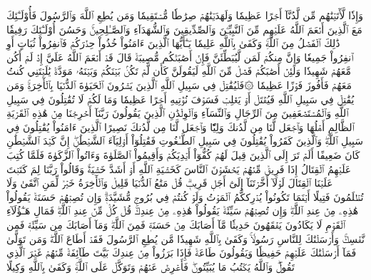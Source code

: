 وَإِذٗا لَّأٓتَيۡنَٰهُم مِّن لَّدُنَّآ أَجۡرًا عَظِيمٗا
وَلَهَدَيۡنَٰهُمۡ صِرَٰطٗا مُّسۡتَقِيمٗا
وَمَن يُطِعِ ٱللَّهَ وَٱلرَّسُولَ فَأُوْلَـٰٓئِكَ مَعَ ٱلَّذِينَ أَنۡعَمَ ٱللَّهُ عَلَيۡهِم مِّنَ ٱلنَّبِيِّـۧنَ وَٱلصِّدِّيقِينَ وَٱلشُّهَدَآءِ وَٱلصَّـٰلِحِينَۚ وَحَسُنَ أُوْلَـٰٓئِكَ رَفِيقٗا
ذَٰلِكَ ٱلۡفَضۡلُ مِنَ ٱللَّهِۚ وَكَفَىٰ بِٱللَّهِ عَلِيمٗا
يَـٰٓأَيُّهَا ٱلَّذِينَ ءَامَنُواْ خُذُواْ حِذۡرَكُمۡ فَٱنفِرُواْ ثُبَاتٍ أَوِ ٱنفِرُواْ جَمِيعٗا
وَإِنَّ مِنكُمۡ لَمَن لَّيُبَطِّئَنَّ فَإِنۡ أَصَٰبَتۡكُم مُّصِيبَةٞ قَالَ قَدۡ أَنۡعَمَ ٱللَّهُ عَلَيَّ إِذۡ لَمۡ أَكُن مَّعَهُمۡ شَهِيدٗا
وَلَئِنۡ أَصَٰبَكُمۡ فَضۡلٞ مِّنَ ٱللَّهِ لَيَقُولَنَّ كَأَن لَّمۡ تَكُنۢ بَيۡنَكُمۡ وَبَيۡنَهُۥ مَوَدَّةٞ يَٰلَيۡتَنِي كُنتُ مَعَهُمۡ فَأَفُوزَ فَوۡزًا عَظِيمٗا
۞فَلۡيُقَٰتِلۡ فِي سَبِيلِ ٱللَّهِ ٱلَّذِينَ يَشۡرُونَ ٱلۡحَيَوٰةَ ٱلدُّنۡيَا بِٱلۡأٓخِرَةِۚ وَمَن يُقَٰتِلۡ فِي سَبِيلِ ٱللَّهِ فَيُقۡتَلۡ أَوۡ يَغۡلِبۡ فَسَوۡفَ نُؤۡتِيهِ أَجۡرًا عَظِيمٗا
وَمَا لَكُمۡ لَا تُقَٰتِلُونَ فِي سَبِيلِ ٱللَّهِ وَٱلۡمُسۡتَضۡعَفِينَ مِنَ ٱلرِّجَالِ وَٱلنِّسَآءِ وَٱلۡوِلۡدَٰنِ ٱلَّذِينَ يَقُولُونَ رَبَّنَآ أَخۡرِجۡنَا مِنۡ هَٰذِهِ ٱلۡقَرۡيَةِ ٱلظَّالِمِ أَهۡلُهَا وَٱجۡعَل لَّنَا مِن لَّدُنكَ وَلِيّٗا وَٱجۡعَل لَّنَا مِن لَّدُنكَ نَصِيرًا
ٱلَّذِينَ ءَامَنُواْ يُقَٰتِلُونَ فِي سَبِيلِ ٱللَّهِۖ وَٱلَّذِينَ كَفَرُواْ يُقَٰتِلُونَ فِي سَبِيلِ ٱلطَّـٰغُوتِ فَقَٰتِلُوٓاْ أَوۡلِيَآءَ ٱلشَّيۡطَٰنِۖ إِنَّ كَيۡدَ ٱلشَّيۡطَٰنِ كَانَ ضَعِيفًا
أَلَمۡ تَرَ إِلَى ٱلَّذِينَ قِيلَ لَهُمۡ كُفُّوٓاْ أَيۡدِيَكُمۡ وَأَقِيمُواْ ٱلصَّلَوٰةَ وَءَاتُواْ ٱلزَّكَوٰةَ فَلَمَّا كُتِبَ عَلَيۡهِمُ ٱلۡقِتَالُ إِذَا فَرِيقٞ مِّنۡهُمۡ يَخۡشَوۡنَ ٱلنَّاسَ كَخَشۡيَةِ ٱللَّهِ أَوۡ أَشَدَّ خَشۡيَةٗۚ وَقَالُواْ رَبَّنَا لِمَ كَتَبۡتَ عَلَيۡنَا ٱلۡقِتَالَ لَوۡلَآ أَخَّرۡتَنَآ إِلَىٰٓ أَجَلٖ قَرِيبٖۗ قُلۡ مَتَٰعُ ٱلدُّنۡيَا قَلِيلٞ وَٱلۡأٓخِرَةُ خَيۡرٞ لِّمَنِ ٱتَّقَىٰ وَلَا تُظۡلَمُونَ فَتِيلًا
أَيۡنَمَا تَكُونُواْ يُدۡرِككُّمُ ٱلۡمَوۡتُ وَلَوۡ كُنتُمۡ فِي بُرُوجٖ مُّشَيَّدَةٖۗ وَإِن تُصِبۡهُمۡ حَسَنَةٞ يَقُولُواْ هَٰذِهِۦ مِنۡ عِندِ ٱللَّهِۖ وَإِن تُصِبۡهُمۡ سَيِّئَةٞ يَقُولُواْ هَٰذِهِۦ مِنۡ عِندِكَۚ قُلۡ كُلّٞ مِّنۡ عِندِ ٱللَّهِۖ فَمَالِ هَـٰٓؤُلَآءِ ٱلۡقَوۡمِ لَا يَكَادُونَ يَفۡقَهُونَ حَدِيثٗا
مَّآ أَصَابَكَ مِنۡ حَسَنَةٖ فَمِنَ ٱللَّهِۖ وَمَآ أَصَابَكَ مِن سَيِّئَةٖ فَمِن نَّفۡسِكَۚ وَأَرۡسَلۡنَٰكَ لِلنَّاسِ رَسُولٗاۚ وَكَفَىٰ بِٱللَّهِ شَهِيدٗا
مَّن يُطِعِ ٱلرَّسُولَ فَقَدۡ أَطَاعَ ٱللَّهَۖ وَمَن تَوَلَّىٰ فَمَآ أَرۡسَلۡنَٰكَ عَلَيۡهِمۡ حَفِيظٗا
وَيَقُولُونَ طَاعَةٞ فَإِذَا بَرَزُواْ مِنۡ عِندِكَ بَيَّتَ طَآئِفَةٞ مِّنۡهُمۡ غَيۡرَ ٱلَّذِي تَقُولُۖ وَٱللَّهُ يَكۡتُبُ مَا يُبَيِّتُونَۖ فَأَعۡرِضۡ عَنۡهُمۡ وَتَوَكَّلۡ عَلَى ٱللَّهِۚ وَكَفَىٰ بِٱللَّهِ وَكِيلًا
